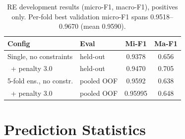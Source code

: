 \documentclass[11pt]{article}
\begin{document}
\begin{table}[H]
\centering
\small
\setlength{\tabcolsep}{2.5pt}
\begin{tabular}{llcc}
\toprule
\textbf{Config} & \textbf{Eval} & \textbf{Mi-F1} & \textbf{Ma-F1} \\
\midrule
Single, no constraints & held-out & 0.9378 & 0.656 \\
\ + penalty 3.0 & held-out & 0.9470 & 0.705 \\
5-fold ens., no constr. & pooled OOF & 0.9592 & 0.638 \\
\ + penalty 3.0 & pooled OOF & 0.95995 & 0.648 \\
\bottomrule
\end{tabular}
\caption{RE development results (micro-F1, macro-F1), positives only.
Per-fold best validation micro-F1 spans 0.9518--0.9670 (mean 0.9590).}
\label{tab:redev}
\end{table}

\section{Prediction Statistics}
\label{app:stats}
\end{document}

